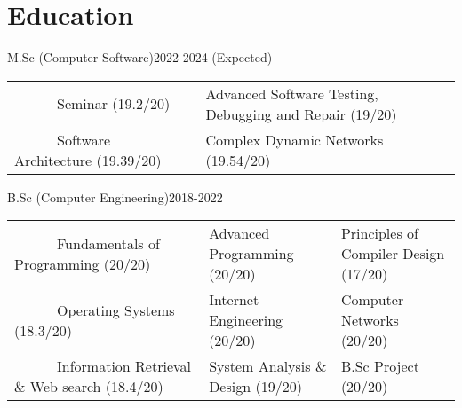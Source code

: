 \documentclass[11pt,a4paper,sans]{moderncv}
\title{}
\begin{document}
\hypersetup{
    linkcolor=blue,
    filecolor=magenta,
    urlcolor=cyan,
}
\noindent
\makecvtitle

\vspace{-0.5em}



\vspace{-0.4em}
\section{Education}

{M.Sc (Computer Software)}{2022-2024 (Expected)}{}{}
\small{
	\begin{tabular}
		{l@{\hskip 5mm}l@{\hskip 5mm}l}
		~~~~~~Seminar (19.2/20)   &    Advanced Software Testing, Debugging and Repair (19/20) \\
		~~~~~~Software Architecture (19.39/20)  & Complex Dynamic Networks (19.54/20) \\
	\end{tabular}
	\medskip
} %

\vspace{-0.2em}

\vspace{0.6em}

{B.Sc (Computer Engineering)}{2018-2022}{}{}
\small{
	\begin{tabular}
		{l@{\hskip 5mm}l@{\hskip 5mm}l}
		~~~~~~Fundamentals of Programming (20/20) & Advanced Programming (20/20) & Principles of Compiler Design (17/20) \\
		~~~~~~Operating Systems (18.3/20) & Internet Engineering (20/20) &  Computer Networks (20/20) \\
		~~~~~~Information Retrieval \& Web search (18.4/20) & System Analysis \& Design (19/20) & B.Sc Project (20/20)

	\end{tabular}
	\medskip
} %
\end{document}
